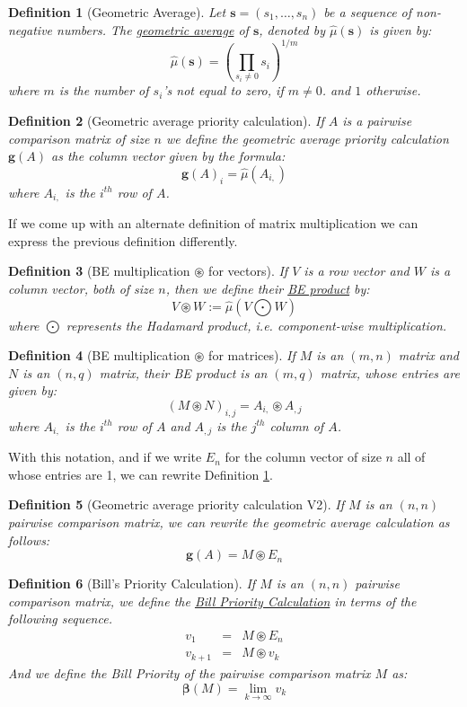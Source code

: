 \documentclass{article}
\newtheorem{definition}{Definition}
\begin{document}
\begin{definition}[Geometric Average]
\label{def:geomavg1}
	Let $\mathbf{s}=(s_1, \ldots, s_n)$ be a sequence of non-negative
	numbers.  The \ul{geometric average} of $\mathbf{s}$, denoted by
	$\widehat{\mu}(\mathbf{s})$ is given by:
	$$\widehat{\mu}(\mathbf{s}) =
	\left(\prod_{s_i \neq 0}s_i\right)^{1/m}$$
	where $m$ is the number of $s_i$'s not equal to zero, if $m\neq 0$.
	and $1$ otherwise.
\end{definition}

\begin{definition}[Geometric average priority calculation]
	If $A$ is a pairwise comparison matrix of size $n$ we define the geometric
	average priority calculation $\mathbf{g}(A)$ as the column vector
	given by the formula:
	$$\mathbf{g}(A)_{i} = \widehat{\mu}(A_{i,})$$
	where $A_{i,}$ is the $i^{th}$ row of $A$.
\end{definition}

If we come up with an alternate definition of matrix multiplication
we can express the previous definition differently.

\begin{definition}[BE multiplication $\circledast$ for vectors]
	If $V$ is a row vector and $W$ is a column vector, both of size
	$n$, then we define their \ul{BE product} by:
	$$V \circledast W := \widehat{\mu}(V \bigodot W)$$
	where $\bigodot$ represents the Hadamard product, i.e.
	component-wise multiplication.
\end{definition}

\begin{definition}[BE multiplication $\circledast$ for matrices]
	If $M$ is an $(m,n)$ matrix and $N$ is an $(n,q)$ matrix, their
	BE product is an $(m,q)$ matrix, whose entries are given by:
	$$
	\left(M \circledast N\right)_{i,j} =
	A_{i,} \circledast A_{, j}
	$$
	where $A_{i,}$ is the $i^{th}$ row of $A$ and $A_{,j}$ is the
	$j^{th}$ column of $A$.
\end{definition}

With this notation, and if we write $E_n$ for the column vector of
size $n$ all of whose entries are 1, we can rewrite Definition
\ref{def:geomavg1}.

\begin{definition}[Geometric average priority calculation V2]
	If $M$ is an $(n,n)$ pairwise comparison matrix, we can rewrite
	the geometric average calculation as follows:
	$$
	\mathbf{g}(A) = M \circledast E_n
	$$
\end{definition}

\begin{definition}[Bill's Priority Calculation]
	If $M$ is an $(n,n)$ pairwise comparison matrix, we define the
	\ul{Bill Priority Calculation} in terms of the following sequence.
	\begin{eqnarray*}
		v_1 &=& M \circledast E_n \\
		v_{k+1} &=& M \circledast v_k
	\end{eqnarray*}
	And we define the Bill Priority of the pairwise comparison
	matrix $M$ as:
	$$\mathbf{\beta}(M) = \lim_{k \to \infty} v_k$$
\end{definition}
\end{document}
